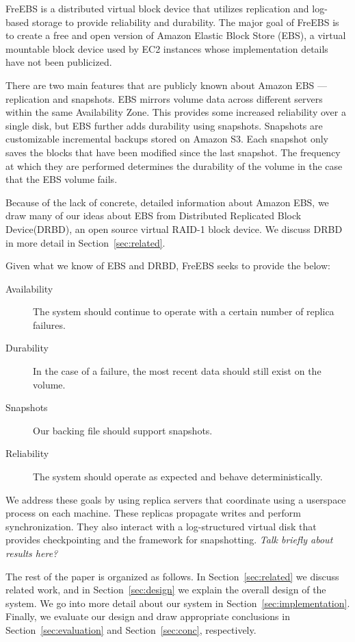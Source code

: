 FreEBS is a distributed virtual block device that utilizes replication and 
log-based storage to provide reliability and durability. The major 
goal of FreEBS is to create a free and open version of Amazon Elastic Block 
Store (EBS)\cite{amazonEBS}, a virtual mountable block device used by EC2 
instances whose implementation details have not been publicized. 

There are two main features that are publicly known about Amazon EBS --- 
replication and snapshots. EBS mirrors volume data across different 
servers within the same 
Availability Zone. This provides some increased reliability over a single 
disk, but EBS further adds durability using snapshots. Snapshots are 
customizable incremental backups stored on Amazon S3. Each snapshot only 
saves the blocks that have been modified since the last snapshot. The 
frequency at which they are performed determines the durability of the volume
in the case that the EBS volume fails. \cite{amazonEBS} 

Because of the lack of concrete, detailed information about Amazon EBS, we 
draw many of our ideas about EBS from Distributed Replicated Block 
Device\textsuperscript{\textregistered}(DRBD)\cite{drbd}, an open source 
virtual RAID-1 block device. We discuss DRBD\textsuperscript{\textregistered}
in more detail in Section~\ref{sec:related}.

Given what we know of EBS and DRBD, FreEBS seeks to provide the below:

\begin{description}
    \item[Availability]{The system should continue to operate with a certain
            number of replica failures.}
    \item[Durability]{In the case of a failure, the most recent data should
            still exist on the volume.}
    \item[Snapshots]{Our backing file should support snapshots.}
    \item[Reliability]{The system should operate as expected and behave
            deterministically.}
\end{description}

We address these goals by using replica servers that coordinate using a
userspace process on each machine. These replicas propagate writes and 
perform synchronization. They also interact with a log-structured virtual 
disk that provides checkpointing and the framework for snapshotting. 
\emph{Talk briefly about results here?}

The rest of the paper is organized as follows. In Section~\ref{sec:related}
we discuss related work, and in Section~\ref{sec:design} we explain the 
overall design of the system. We go into more detail about our system in 
Section~\ref{sec:implementation}. Finally, we evaluate our design and draw
appropriate conclusions in Section~\ref{sec:evaluation} and 
Section~\ref{sec:conc}, respectively.
